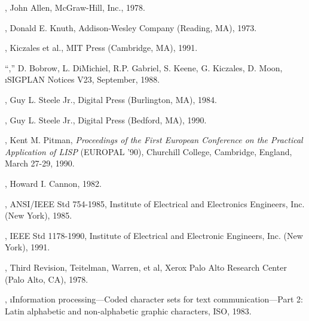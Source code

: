 
\beginlist

\item{\bull} {\AnatomyOfLisp},
        John Allen, McGraw-Hill, Inc., 1978.

\item{\bull} {\KnuthVolThree},
             Donald E. Knuth, Addison-Wesley Company (Reading, MA), 1973.

\item{\bull} {\MetaObjectProtocol},
	Kiczales et al., MIT Press (Cambridge, MA), 1991.

\item{\bull} ``\CLOSPaper,''
        D. Bobrow, L. DiMichiel, R.P. Gabriel, S. Keene, G. Kiczales, D. Moon,
        \i{SIGPLAN Notices} V23, September, 1988.

\item{\bull} {\CLtL},
        Guy L. Steele Jr., Digital Press (Burlington, MA), 1984.

\item{\bull} {\CLtLTwo},
        Guy L. Steele Jr., Digital Press (Bedford, MA), 1990.

\item{\bull} {\CondSysPaper},
	Kent M. Pitman,
	{\it Proceedings of the First European Conference
	     on the Practical Application of LISP\/}
        (EUROPAL '90),
	Churchill College, Cambridge, England,
	March 27-29, 1990.

\item{\bull} {\FlavorsPaper},
	Howard I. Cannon, 1982.

\item{\bull} {\IEEEFloatingPoint},
        ANSI/IEEE Std 754-1985,
        Institute of Electrical and Electronics Engineers, Inc. (New York), 1985.

\item{\bull} {\IEEEScheme},
	IEEE Std 1178-1990,
	Institute of Electrical and Electronic Engineers, Inc. (New York), 1991.

\item{\bull} {\InterlispManual}, Third Revision,
	Teitelman, Warren, et al,
	Xerox Palo Alto Research Center (Palo Alto, CA), 1978.

\item{\bull} \ISOChars,
	\i{Information processing---Coded character sets 
           for text communication---Part 2: Latin alphabetic and non-alphabetic
           graphic characters}, 
	ISO, 1983.


